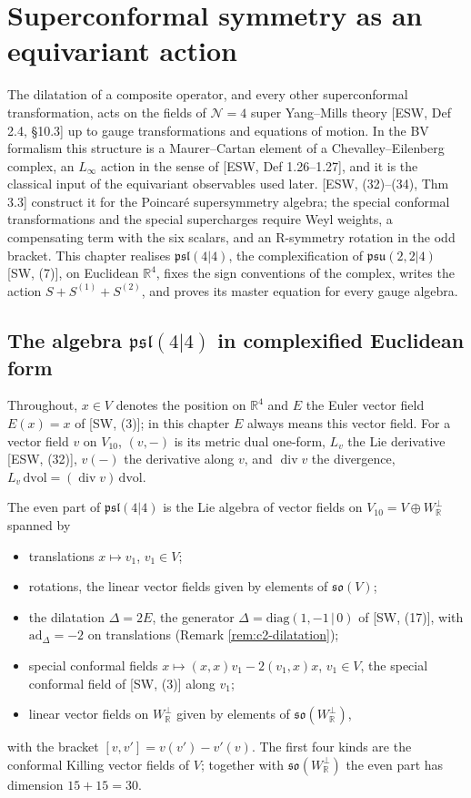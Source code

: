 \chapter{Superconformal symmetry as an equivariant action}

The dilatation of a composite operator, and every other superconformal transformation, acts on the fields of $\mathcal N=4$ super Yang--Mills theory [ESW, Def 2.4, §10.3] up to gauge transformations and equations of motion. In the BV formalism this structure is a Maurer--Cartan element of a Chevalley--Eilenberg complex, an $L_\infty$ action in the sense of [ESW, Def 1.26--1.27], and it is the classical input of the equivariant observables used later. [ESW, (32)--(34), Thm 3.3] construct it for the Poincaré supersymmetry algebra; the special conformal transformations and the special supercharges require Weyl weights, a compensating term with the six scalars, and an R-symmetry rotation in the odd bracket. This chapter realises $\mathfrak{psl}(4|4)$, the complexification of $\mathfrak{psu}(2,2|4)$ [SW, (7)], on Euclidean $\mathbb R^4$, fixes the sign conventions of the complex, writes the action $S+S^{(1)}+S^{(2)}$, and proves its master equation for every gauge algebra.

\section{The algebra $\mathfrak{psl}(4|4)$ in complexified Euclidean form}

Throughout, $x\in V$ denotes the position on $\mathbb R^4$ and $E$ the Euler vector field $E(x)=x$ of [SW, (3)]; in this chapter $E$ always means this vector field. For a vector field $v$ on $V_{10}$, $(v,-)$ is its metric dual one-form, $L_v$ the Lie derivative [ESW, (32)], $v(-)$ the derivative along $v$, and $\operatorname{div}v$ the divergence, $L_v\,\mathrm{dvol}=(\operatorname{div}v)\,\mathrm{dvol}$.

\begin{definition}
\label{def:c2-even}
The even part of $\mathfrak{psl}(4|4)$ is the Lie algebra of vector fields on $V_{10}=V\oplus W_{\mathbb R}^\perp$ spanned by
\begin{itemize}
\item translations $x\mapsto v_1$, $v_1\in V$;
\item rotations, the linear vector fields given by elements of $\mathfrak{so}(V)$;
\item the dilatation $\Delta=2E$, the generator $\Delta=\mathrm{diag}(1,-1\,|\,0)$ of [SW, (17)], with $\mathrm{ad}_\Delta=-2$ on translations (Remark \ref{rem:c2-dilatation});
\item special conformal fields $x\mapsto(x,x)v_1-2(v_1,x)x$, $v_1\in V$, the special conformal field of [SW, (3)] along $v_1$;
\item linear vector fields on $W_{\mathbb R}^\perp$ given by elements of $\mathfrak{so}(W_{\mathbb R}^\perp)$,
\end{itemize}
with the bracket $[v,v']=v(v')-v'(v)$. The first four kinds are the conformal Killing vector fields of $V$; together with $\mathfrak{so}(W_{\mathbb R}^\perp)$ the even part has dimension $15+15=30$.
\end{definition}

